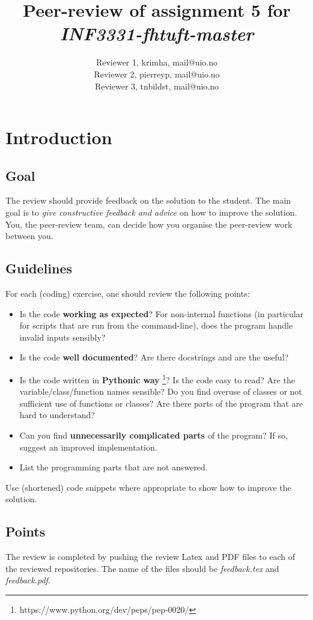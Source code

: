 \documentclass[a4paper]{article}
\title{Peer-review of assignment 5 for \textit{INF3331-fhtuft-master}}
\author{Reviewer 1, krimha, {mail@uio.no} \\
 		Reviewer 2, pierreyp, {mail@uio.no} \\
		Reviewer 3, tnbildst, {mail@uio.no}}
\begin{document}
\maketitle

\section{Introduction}
\subsection{Goal}
The review should provide feedback on the solution to the student. The main goal is to \emph{give constructive feedback and advice} on how to improve the solution. You, the peer-review team, can decide how you organise the peer-review work between you. 

\subsection{Guidelines}\label{sec:general_review}
For each (coding) exercise, one should review the following points:

\begin{itemize}
  \item Is the code \textbf{working as expected}? For non-internal functions (in particular for scripts that are run from the command-line), does the program handle invalid inputs sensibly?
  \item Is the code \textbf{well documented}? Are there docstrings and are the useful?
  \item Is the code written in \textbf{Pythonic way} \footnote{https://www.python.org/dev/peps/pep-0020/}? Is the code easy to read? Are the variable/class/function names sensible? Do you find overuse of classes or not sufficient use of functions or classes? Are there parts of the program that are hard to understand? 
  \item Can you find \textbf{unnecessarily complicated parts} of the program? If so, suggest an improved implementation.
  \item List the programming parts that are not answered.
\end{itemize}
Use (shortened) code snippets where appropriate to show how to improve the solution. 

\subsection{Points}
The review is completed by pushing the review Latex and PDF files to each of the reviewed repositories. The name of the files should be \emph{feedback.tex} and \emph{feedback.pdf}.
\end{document}
